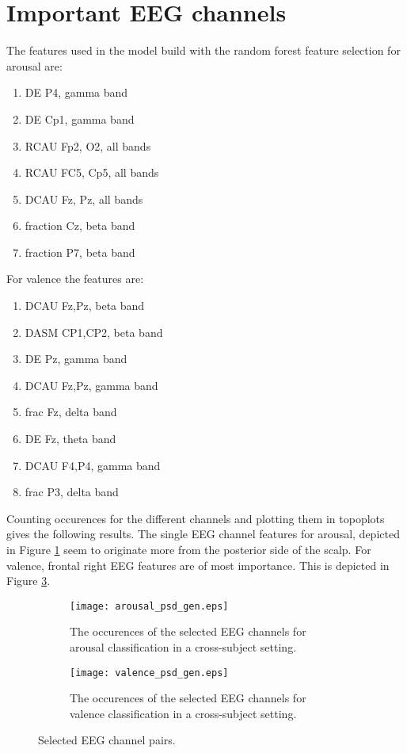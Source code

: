 \section{Important EEG channels}

The features used in the model build with the random forest feature selection for arousal are:
\begin{enumerate}
\item DE P4, gamma band
\item DE Cp1, gamma band
\item RCAU Fp2, O2, all bands
\item RCAU FC5, Cp5, all bands
\item DCAU Fz, Pz, all bands
\item fraction Cz, beta band
\item fraction P7, beta band
\end{enumerate}

For valence the features are:
\begin{enumerate}
\item DCAU Fz,Pz, beta band
\item DASM CP1,CP2, beta band
\item DE Pz, gamma band
\item DCAU Fz,Pz, gamma band
\item frac Fz, delta band
\item DE Fz, theta band
\item DCAU F4,P4, gamma band
\item frac P3, delta band
\end{enumerate}

Counting occurences for the different channels and plotting them in topoplots gives the following results. The single EEG channel features for arousal, depicted in Figure \ref{arousalchannel_gen} seem to originate more from the posterior side of the scalp. For valence, frontal right EEG features are of most importance. This is depicted in Figure \ref{valencechannel_gen}.

\begin{figure}[H]
\centering
  \begin{subfigure}[b]{.4\textwidth}
    \texttt{[image: arousal\_psd\_gen.eps]}
    \caption{The occurences of the selected EEG channels for arousal classification in a cross-subject setting.\label{arousalchannel_gen}}
  \end{subfigure}
\hfill
  \begin{subfigure}[b]{.4\textwidth}
    \texttt{[image: valence\_psd\_gen.eps]}
    \caption{The occurences of the selected EEG channels for valence classification in a cross-subject setting.\label{valencechannel_gen}}
  \end{subfigure}
\caption{Selected EEG channel pairs.}
\end{figure}

